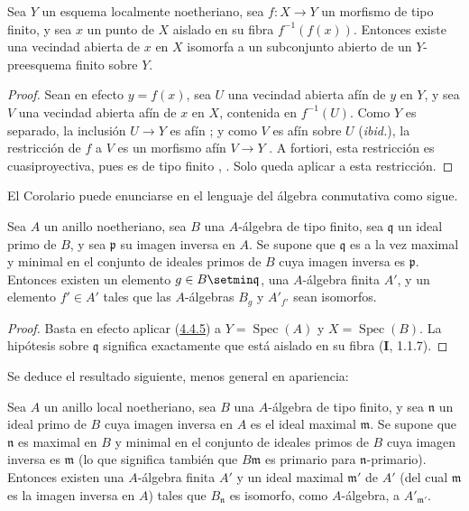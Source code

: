 \begin{corollary}[4.4.5]
\label{III.4.4.5}
\label{III.4.4.5-fr}
Sea $Y$ un esquema localmente noetheriano, sea $f:X\to Y$ un
morfismo de tipo finito, y sea $x$ un punto de $X$ aislado en su fibra
$f^{-1}(f(x))$. Entonces existe una vecindad abierta de $x$ en $X$
isomorfa a un subconjunto abierto de un $Y$-preesquema finito sobre $Y$.
\end{corollary}

\begin{proof}
Sean en efecto $y=f(x)$, sea $U$ una vecindad abierta afín de $y$ en $Y$, y
sea $V$ una vecindad abierta afín de $x$ en $X$, contenida en
$f^{-1}(U)$. Como $Y$ es separado, la inclusión $U\to Y$ es afín
; y como $V$ es afín sobre $U$ (\emph{ibid.}), la
restricción de $f$ a $V$ es un morfismo afín $V\to Y$
. A fortiori, esta restricción es
cuasiproyectiva, pues es de tipo finito
, . Solo queda aplicar
 a esta restricción.
\end{proof}

El Corolario  puede enunciarse en el lenguaje del
álgebra conmutativa como sigue.


\begin{corollary}[4.4.6]
\label{III.4.4.6}
\label{III.4.4.6-fr}
Sea $A$ un anillo noetheriano, sea $B$ una $A$-álgebra de tipo
finito, sea $\mathfrak q$ un ideal primo de $B$, y sea $\mathfrak p$
su imagen inversa en $A$. Se supone que $\mathfrak q$ es a la vez
maximal y minimal en el conjunto de ideales primos de $B$ cuya imagen
inversa es $\mathfrak p$. Entonces existen un elemento
$g\in B\setmin\mathfrak q$, una $A$-álgebra finita $A'$, y un elemento
$f'\in A'$ tales que las $A$-álgebras $B_g$ y $A'_{f'}$ sean isomorfos.
\end{corollary}

\begin{proof}
Basta en efecto aplicar (\hyperref[III.4.4.5-fr]{4.4.5}) a $Y=\operatorname{Spec}(A)$ y $X=\operatorname{Spec}(B)$. La
hipótesis sobre $\mathfrak q$ significa exactamente que está aislado en su fibra
(\textbf{I}, 1.1.7).
\end{proof}

Se deduce el resultado siguiente, menos general en apariencia:

\begin{corollary}[4.4.7]
\label{III.4.4.7}
\label{III.4.4.7-fr}
Sea $A$ un anillo local noetheriano, sea $B$ una $A$-álgebra de tipo
finito, y sea $\mathfrak n$ un ideal primo de $B$ cuya imagen inversa
en $A$ es el ideal maximal $\mathfrak m$. Se supone que $\mathfrak n$
es maximal en $B$ y minimal en el conjunto de ideales primos de $B$
cuya imagen inversa es $\mathfrak m$ (lo que significa también que
$B\mathfrak m$ es primario para $\mathfrak n$-primario). Entonces existen una
$A$-álgebra finita $A'$ y un ideal maximal $\mathfrak m'$ de $A'$ (del cual
$\mathfrak m$ es la imagen inversa en $A$) tales que $B_{\mathfrak n}$ es isomorfo, como $A$-álgebra, a $A'_{\mathfrak m'}$.
\end{corollary}

